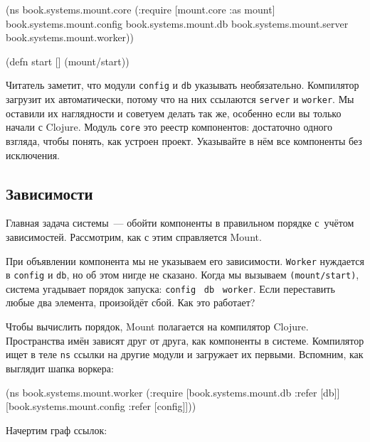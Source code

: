 \begin{english}
  \begin{clojure}
(ns book.systems.mount.core
  (:require
   [mount.core :as mount]
   book.systems.mount.config
   book.systems.mount.db
   book.systems.mount.server
   book.systems.mount.worker))

(defn start []
  (mount/start))
  \end{clojure}
\end{english}

Читатель заметит, что модули \verb|config| и \verb|db| указывать
необязательно. Компилятор загрузит их автоматически, потому что на них ссылаются
\verb|server| и \verb|worker|. Мы оставили их наглядности и советуем делать так
же, особенно если вы только начали с Clojure. Модуль \verb|core| это реестр
компонентов: достаточно одного взгляда, чтобы понять, как устроен
проект. Указывайте в нём все компоненты без исключения.

\subsection{Зависимости}


Главная задача системы~--- обойти компоненты в правильном порядке с~учётом
зависимостей. Рассмотрим, как с этим справляется Mount.

При объявлении компонента мы не указываем его зависимости. \verb|Worker|
нуждается в \verb|config| и \verb|db|, но об этом нигде не сказано. Когда мы
вызываем \verb|(mount/start)|, система угадывает порядок запуска:
\verb|config|~\arr{} \verb|db|~\arr{} \verb|worker|. Если переставить любые два
элемента, произойдёт сбой. Как это работает?

Чтобы вычислить порядок, Mount полагается на компилятор Clojure. Пространства
имён зависят друг от друга, как компоненты в системе. Компилятор ищет в теле
\verb|ns| ссылки на другие модули и загружает их первыми. Вспомним, как
выглядит шапка воркера:

\begin{english}
  \begin{clojure}
(ns book.systems.mount.worker
  (:require
   [book.systems.mount.db :refer [db]]
   [book.systems.mount.config :refer [config]]))
  \end{clojure}
\end{english}

\noindent
Начертим граф ссылок:


